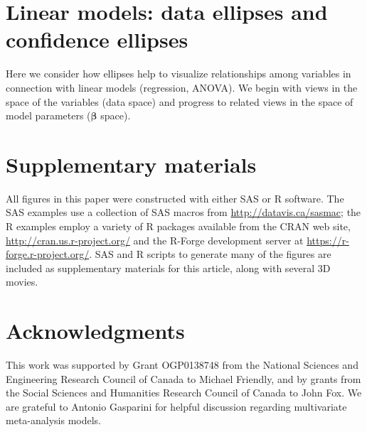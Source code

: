 \documentclass[11pt]{article}%
\renewcommand*{\vec}[1]{\ensuremath{\bm{#1}}}     %
\begin{document}







\section{Linear models: data ellipses and confidence ellipses}

Here we consider how ellipses help to visualize relationships among variables
in connection with linear models (regression, ANOVA).
We begin with views in the space of the variables (data space)
and progress to related views in the space of model parameters
($\vec{\beta}$ space).























\section{Supplementary materials}

All figures in this paper were constructed with either SAS or R software.
The SAS examples use a collection of SAS macros from \url{http://datavis.ca/sasmac}; the
R examples employ a variety of R packages available from the CRAN web site, \url{http://cran.us.r-project.org/}
and the R-Forge development server at \url{https://r-forge.r-project.org/}.
SAS and R scripts to generate many of the figures are included as supplementary materials for this article,
along with several 3D movies.


\section{Acknowledgments}

This work was supported by Grant OGP0138748 from the National Sciences and Engineering Research Council of Canada to Michael Friendly,
and by grants from the Social Sciences and Humanities Research Council of Canada to John Fox.
We are grateful to Antonio Gasparini for helpful discussion regarding multivariate meta-analysis models.


%
\end{document}
